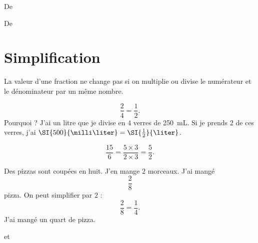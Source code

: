 

De \cite{NRHooXFvgpp5}


De \cite{NRHooXFvgpp5}

\section{Simplification}

\begin{Aretenir}
    La valeur d'une fraction ne change pas si on multiplie ou divise le numérateur et le dénominateur par un même nombre.
\end{Aretenir}

\begin{example}
    \begin{equation}
        \frac{ 2 }{ 4 }=\frac{ 1 }{2}.
    \end{equation}
    Pourquoi ? J'ai un litre que je divise en \( 4\) verres de \SI{250}{\milli\liter}. Si je prends \( 2\) de ces verres, j'ai \( \SI{500}{\milli\liter}=\SI{\frac{ 1 }{2}}{\liter}\).
\end{example}

\begin{example}
    \begin{equation}
        \frac{ 15 }{ 6 }=\frac{ 5\times 3 }{ 2\times 3 }=\frac{ 5 }{ 2 }.
    \end{equation}
\end{example}

\begin{example}
    Des pizzas sont coupées en huit. J'en mange \( 2\) morceaux. J'ai mangé
    \begin{equation}
        \frac{ 2 }{ 8 }
    \end{equation}
    pizza. On peut simplifier par \( 2\) :
    \begin{equation}
        \frac{ 2 }{ 8 }=\frac{1}{ 4 }.
    \end{equation}
    J'ai mangé un quart de pizza.


\begin{center}
   
\end{center}

et

\begin{center}
   
\end{center}


\end{example}


